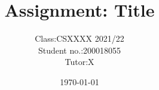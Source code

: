


\title{Assignment: Title}
\author{
    \begin{tabular}{rl}
        Class:& CSXXXX 2021/22 \\
        Student no.:& 200018055 \\
        Tutor:& X \\
    \end{tabular}
}
\date{\today}
\maketitle




